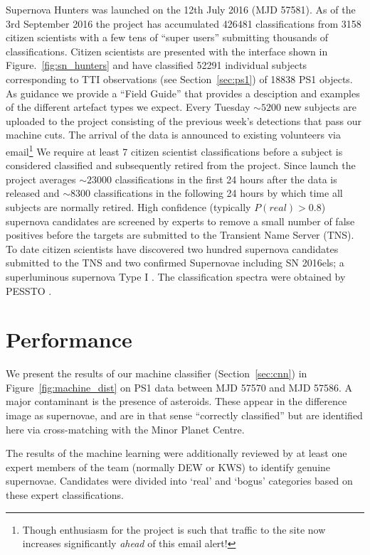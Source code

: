 \documentclass[a4paper,fleqn,usenatbib]{mnras}
\begin{document}
Supernova Hunters was launched on the 12th July 2016 (MJD 57581).  As of the 3rd September 2016 the project has accumulated 426481 classifications from 3158 citizen scientists with a few tens of ``super users'' submitting thousands of classifications.  Citizen scientists are presented with the interface shown in Figure.~\ref{fig:sn_hunters} and have classified 52291 individual subjects corresponding to TTI observations (see Section~\ref{sec:ps1}) of 18838 PS1 objects. As guidance we provide a ``Field Guide'' that provides a desciption and examples of the different artefact types we expect.  Every Tuesday $\sim5200$ new subjects are uploaded to the project consisting of the previous week's detections that pass our machine cuts. The arrival of the data is announced to existing volunteers via email\footnote{Though enthusiasm for the project is such that traffic to the site now increases significantly \emph{ahead} of this email alert!} We require at least 7 citizen scientist classifications before a subject is considered classified and subsequently  retired from the project.  Since launch the project averages $\sim23000$ classifications in the first 24 hours after the data is released and $\sim8300$ classifications in the following 24 hours by which time all subjects are normally retired. High confidence (typically $P(real)>0.8$) supernova candidates are screened by experts to remove a small number of false positives before the targets are submitted to the Transient Name Server (TNS).  To date citizen scientists have discovered two hundred supernova candidates submitted to the TNS and two confirmed Supernovae including SN 2016els; a superluminous supernova Type I \citep{Gal-Yam12}.  The classification spectra were obtained by PESSTO \citep{Smartt15}.


\section{Performance}
\label{sec:perform}

We present the results of our machine classifier (Section~\ref{sec:cnn}) in Figure~\ref{fig:machine_dist} on PS1 data between MJD 57570 and MJD 57586. A major contaminant is the presence of asteroids. These appear in the difference image as  supernovae, and are in that sense ``correctly classified'' but are identified here via cross-matching with the Minor Planet Centre.


The results of the machine learning were additionally reviewed by at least one expert members of the team (normally DEW or KWS) to identify genuine supernovae. Candidates were divided into `real' and `bogus' categories based on these expert classifications.
\end{document}
